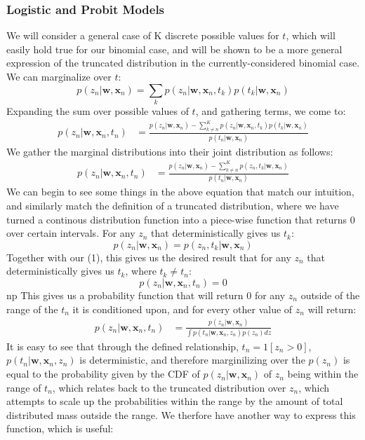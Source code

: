 \documentclass[a4paper,12pt]{article}\usepackage[]{graphicx}\usepackage[]{color}
\begin{document}
\subsubsection*{Logistic and Probit Models}
%
We will consider a general case of K discrete possible values for $t$, which will easily hold true for our binomial case, and will be shown to be a more general expression of the truncated distribution in the currently-considered binomial case. We can marginalize over $t$:
%
$$
p(z_n | \bm{w}, \bm{x}_n) = \sum_k p(z_n | \bm{w}, \bm{x}_n, t_k)p(t_k | \bm{w}, \bm{x}_n)
$$
%
Expanding the sum over possible values of $t$, and gathering terms, we come to:
%
\begin{align*}
p(z_n | \bm{w}, \bm{x}_n, t_n) &= \frac{p(z_n | \bm{w}, \bm{x}_n) - \sum_{k \neq n}^K p(z_n | \bm{w}, \bm{x}_n, t_k)p(t_k | \bm{w}, \bm{x}_n)}{p(t_n | \bm{w}, \bm{x}_n)}
\end{align*}
%
We gather the marginal distributions into their joint distribution as follows:
%
\begin{align}
p(z_n | \bm{w}, \bm{x}_n, t_n) &= \frac{p(z_n | \bm{w}, \bm{x}_n) - \sum_{k \neq n}^K p(z_n, t_k | \bm{w}, \bm{x}_n)}{p(t_n | \bm{w}, \bm{x}_n)}
\end{align}
%
We can begin to see some things in the above equation that match our intuition, and similarly match the definition of a truncated distribution, where we have turned a continous distribution function into a piece-wise function that returns 0 over certain intervals. For any $z_n$ that deterministically gives us $t_k$:
%
$$
p(z_n | \bm{w}, \bm{x}_n) = p(z_n, t_k | \bm{w}, \bm{x}_n)
$$
%
Together with our (1), this gives us the desired result that for any $z_n$ that deterministically gives us $t_k$, where $t_k \neq t_n$:
%
$$
p(z_n | \bm{w}, \bm{x}_n, t_n) = 0
$$
np%
This gives us a probability function that will return 0 for any $z_n$ outside of the range of the $t_n$ it is conditioned upon, and for every other value of $z_n$ will return:
%
\begin{align}
p(z_n | \bm{w}, \bm{x}_n, t_n) &= \frac{p(z_n | \bm{w}, \bm{x}_n)}{\int p(t_n | \bm{w}, \bm{x}_n, z_n)p(z_n)dz}
\end{align}
%
It is easy to see that through the defined relationship, $t_n = 1[z_n > 0]$, $p(t_n | \bm{w}, \bm{x}_n, z_n)$ is deterministic, and therefore marginilizing over the $p(z_n)$ is equal to the probability given by the CDF of $p(z_n | \bm{w}, \bm{x}_n)$ of $z_n$ being within the range of $t_n$, which relates back to the truncated distribution over $z_n$, which attempts to scale up the probabilities within the range by the amount of total distributed mass outside the range. We therfore have another way to express this function, which is useful:
\end{document}
